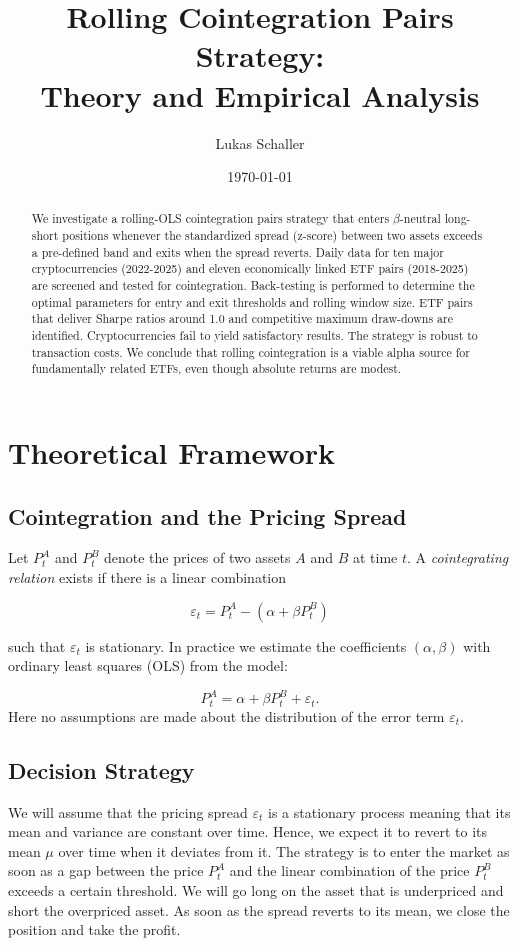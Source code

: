 \documentclass{article}
\title{Rolling Cointegration Pairs Strategy: \\Theory and Empirical Analysis}
\author{Lukas Schaller}
\date{\today}
\begin{document}
\maketitle

\begin{abstract}
We investigate a rolling-OLS cointegration pairs strategy that enters $\beta$-neutral long-short positions whenever the standardized spread (z-score) between two assets exceeds a pre-defined band and exits when the spread reverts.
Daily data for ten major cryptocurrencies (2022-2025) and eleven economically linked ETF pairs (2018-2025) are screened and tested for cointegration. Back-testing is performed to determine the optimal parameters for entry and exit thresholds and rolling window size.
ETF pairs that deliver Sharpe ratios around 1.0 and competitive maximum draw-downs are identified. Cryptocurrencies fail to yield satisfactory results.
The strategy is robust to transaction costs. We conclude that rolling cointegration is a viable alpha source for fundamentally related ETFs, even though absolute returns are modest.
\end{abstract}
\newpage
\tableofcontents
\setlength{\parskip}{0pt}
\clearpage  

\section{Theoretical Framework}
\label{sec:theory}

\subsection{Cointegration and the Pricing Spread}

Let \(P_t^{A}\) and \(P_t^{B}\) denote the prices of two assets $A$ and $B$ at time
\(t\).
A \emph{cointegrating relation} exists if there is a linear combination

\[
\varepsilon_t = P_t^{A} - (\alpha + \beta P_t^{B})
\]

such that \(\varepsilon_t\) is stationary.
In practice we estimate the coefficients \((\alpha,\beta)\) with ordinary least squares (OLS) from the model:

\[
P_t^{A} = \alpha + \beta P_t^{B} + \varepsilon_t.
\]
Here no assumptions are made about the distribution of the error term \(\varepsilon_t\).

\subsection{Decision Strategy}
We will assume that the pricing spread \(\varepsilon_t\) is a stationary process meaning that its mean and variance are constant over time.
Hence, we expect it to revert to its mean \(\mu\) over time when it deviates from it.
The strategy is to enter the market as soon as a gap between the price $P_t^{A}$ and the linear combination of the price $P_t^{B}$ exceeds a certain threshold.
We will go long on the asset that is underpriced and short the overpriced asset. As soon as the spread reverts to its mean, we close the position and take the profit.
\end{document}
